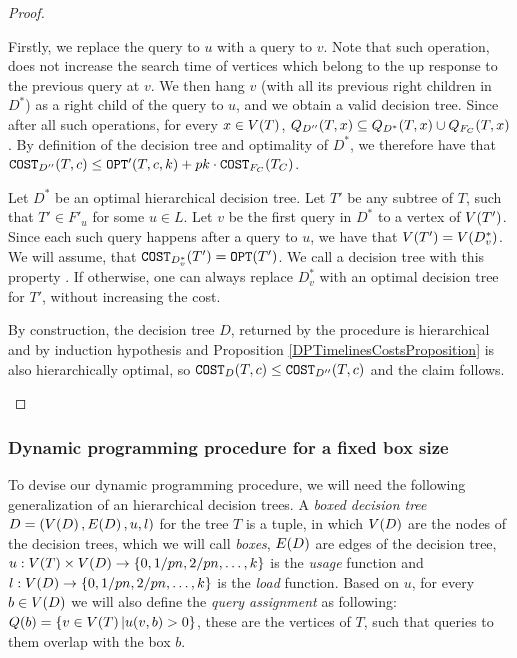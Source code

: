 \begin{lemma}
\begin{proof}
\begin{enumerate}
        Firstly, we replace the query to $u$ with a query to $v$. Note that such operation, does not increase the search time of vertices which belong to the up response to the previous query at $v$. We then hang $v$ (with all its previous right children in $D^*$) as a right child of the query to $u$, and we obtain a valid decision tree. Since after all such operations, for every $x\in V\mathopen{}\left( T \right)$, $Q_{D''}\mathopen{}\left( T,x \right)\subseteq Q_{D^*}\mathopen{}\left( T,x \right)\cup Q_{F_C}\mathopen{}\left( T,x \right)$. By definition of the decision tree and optimality of $D^*$, we therefore have that $\texttt{COST}_{D''}\mathopen{}\left( T,c \right)\leq\texttt{OPT}'\mathopen{}\left( T,c, k \right) + pk\cdot \texttt{COST}_{F_C}\mathopen{}\left( T_C \right)$. 
        
        Let $D^*$ be an optimal hierarchical decision tree. Let $T'$ be any subtree of $T$, such that $T'\in F'_u$ for some $u\in L$. Let $v$ be the first query in $D^*$ to a vertex of $V\mathopen{}\left( T' \right)$. Since each such query happens after a query to $u$, we have that $V\mathopen{}\left( T' \right)=V\mathopen{}\left( D_{v}^* \right)$. We will assume, that $\texttt{COST}_{D_{v}^*}\mathopen{}\left( T' \right)= \texttt{OPT}\mathopen{}\left( T' \right)$. We call a decision tree with this property . If otherwise, one can always replace $D_{v}^*$ with an optimal decision tree for $T'$, without increasing the cost.

        By construction, the decision tree $D$, returned by the procedure is hierarchical and by induction hypothesis and Proposition \ref{DPTimelinesCostsProposition} is also hierarchically optimal, so $\texttt{COST}_{D}\mathopen{}\left( T,c \right)\leq \texttt{COST}_{D''}\mathopen{}\left( T,c \right)$ and the claim follows.

    \end{enumerate}
\end{proof}
\end{lemma}


\subsubsection{Dynamic programming procedure for a fixed box size}



To devise our dynamic programming procedure, we will need the following generalization of an hierarchical decision trees. A \textit{boxed decision tree} $D=\mathopen{}\left( V\mathopen{}\left( D \right), E\mathopen{}\left( D \right), u, l \right)$ for the tree $T$ is a tuple, in which $V\mathopen{}\left( D \right)$ are the nodes of the decision trees, which we will call \textit{boxes}, $E\mathopen{}\left( D \right)$ are edges of the decision tree, $u:V\mathopen{}\left( T \right)\times V\mathopen{}\left( D \right)\to \mathopen{}\left\{ 0, 1/pn,2/pn,\dots,k \right\}$ is the \textit{usage} function and $l:V\mathopen{}\left( D \right)\to\mathopen{}\left\{ 0, 1/pn,2/pn,\dots,k \right\}$ is the \textit{load} function. Based on $u$, for every $b\in V\mathopen{}\left( D \right)$ we will also define the \textit{query assignment} as following: $Q\mathopen{}\left( b \right)=\mathopen{}\left\{ v\in V\mathopen{}\left( T \right)|u\mathopen{}\left( v,b \right)>0 \right\}$, these are the vertices of $T$, such that queries to them overlap with the box $b$.

